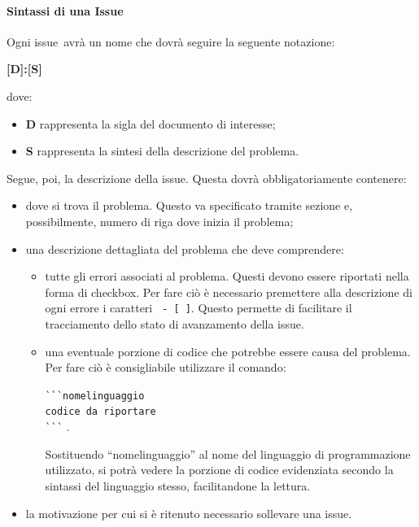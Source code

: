 \documentclass[../NormeProgetto.tex]{subfiles}
\begin{document}
		\paragraph{Sintassi di una Issue}
			Ogni issue\g\ avrà un nome che dovrà seguire la seguente notazione: \begin{center}\textbf{[D]:[S]}\end{center} dove:
				\begin{itemize} 
					\item \textbf{D} rappresenta la sigla del documento di interesse;
					\item \textbf{S} rappresenta la sintesi della descrizione del problema.
				\end{itemize}
				Segue, poi, la descrizione della issue\g. Questa dovrà obbligatoriamente contenere:
			\begin{itemize} 
				\item dove si trova il problema. Questo va specificato tramite sezione e, possibilmente, numero di riga dove inizia il problema;
				\item una descrizione dettagliata del problema che deve comprendere:
				\begin{itemize}
					\item tutte gli errori associati al problema. Questi devono essere riportati nella forma di checkbox. Per fare ciò è necessario premettere alla descrizione di ogni errore i caratteri \texttt{ - [ ]}. Questo permette di facilitare il tracciamento dello stato di avanzamento della issue\g.
					\item una eventuale porzione di codice che potrebbe essere causa del problema. Per fare ciò è consigliabile utilizzare il comando: \begin{center} \texttt {\`{}\`{}\`{}nomelinguaggio\\ codice da riportare\\ \`{}\`{}\`{}} .\end{center} Sostituendo ``nomelinguaggio'' al nome del linguaggio di programmazione utilizzato, si potrà vedere la porzione di codice evidenziata secondo la sintassi del linguaggio stesso, facilitandone la lettura.
				\end{itemize}
				\item la motivazione per cui si è ritenuto necessario sollevare una issue\g.
			\end{itemize}
		
\end{document}
